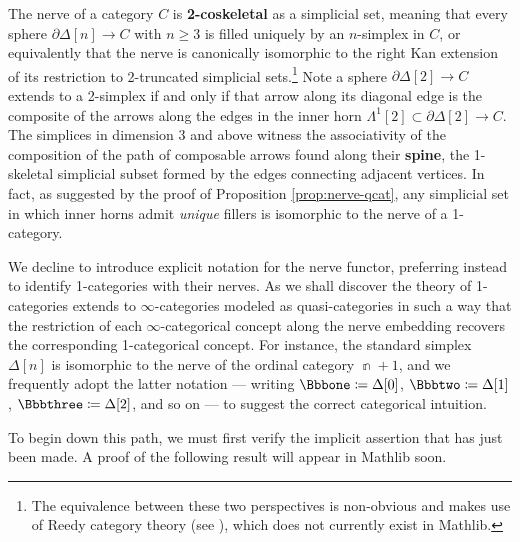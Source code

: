  \begin{rmk}\label{rmk:nerve-2-coskeletal}
 The nerve of a category $C$ is \textbf{2-coskeletal} as a simplicial set, meaning that every sphere $\partial\Delta[n] \to C$ with $n \geq 3$ is filled uniquely by an $n$-simplex in $C$, or equivalently that the nerve is canonically isomorphic to the right Kan extension of its restriction to 2-truncated simplicial sets.\footnote{The equivalence between these two perspectives is non-obvious and makes use of Reedy category theory (see \cite[\S C.4-5]{RiehlVerity:2022eo}), which does not currently exist in Mathlib.}%
  Note a sphere $\partial\Delta[2] \to C$ extends to a 2-simplex if and only if that arrow along its diagonal edge is the composite of the arrows along the edges in the inner horn $\Lambda^1[2] \subset \partial\Delta[2] \to C$. The simplices in dimension 3 and above witness the associativity of the composition of the path of composable arrows found along their  \textbf{spine}, the 1-skeletal simplicial subset formed by the edges connecting adjacent vertices. In fact, as suggested by the proof of Proposition \ref{prop:nerve-qcat}, any simplicial set in which inner horns admit \emph{unique} fillers is isomorphic to the nerve of a 1-category.%
 \end{rmk}

 We decline to introduce explicit notation for the nerve functor, preferring instead to identify 1-categories with their nerves. As we shall discover the theory of 1-categories extends to $\infty$-categories modeled as quasi-categories in such a way that the restriction of each $\infty$-categorical concept along the nerve embedding recovers the corresponding 1-categorical concept. For instance, the standard simplex $\Delta[n]$ is isomorphic to the nerve of the ordinal category $\Bbbn +1$, and we frequently adopt the latter notation --- writing $\catone \coloneq \Delta[0]$, $\cattwo \coloneq \Delta[1]$, $\catthree \coloneq \Delta[2]$, and so on --- to suggest the correct categorical intuition.

 To begin down this path, we must first verify the implicit assertion that has just been made. A proof of the following result will appear in Mathlib soon.

